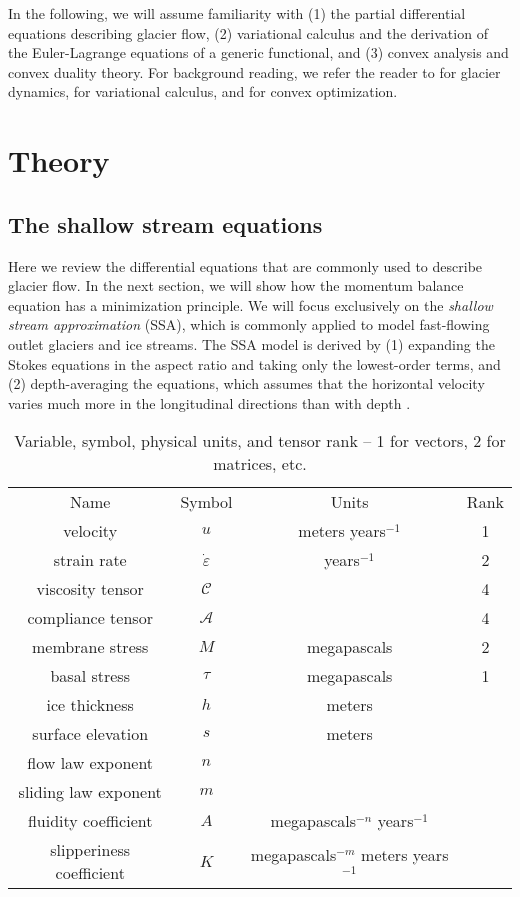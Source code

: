 \documentclass[review,oneside]{igs}
\begin{document}
In the following, we will assume familiarity with (1) the partial differential equations describing glacier flow, (2) variational calculus and the derivation of the Euler-Lagrange equations of a generic functional, and (3) convex analysis and convex duality theory.
For background reading, we refer the reader to \citet{greve2009dynamics} for glacier dynamics, \citet{weinstock1974calculus} for variational calculus, and \citet{boyd2004convex} for convex optimization.



\section{Theory}

\subsection{The shallow stream equations}

Here we review the differential equations that are commonly used to describe glacier flow.
In the next section, we will show how the momentum balance equation has a minimization principle.
We will focus exclusively on the \emph{shallow stream approximation} (SSA), which is commonly applied to model fast-flowing outlet glaciers and ice streams.
The SSA model is derived by (1) expanding the Stokes equations in the aspect ratio and taking only the lowest-order terms, and (2) depth-averaging the equations, which assumes that the horizontal velocity varies much more in the longitudinal directions than with depth \citep{greve2009dynamics}.

\begin{table}[h]
    \begin{tabular}{cccc}
        \cline{1-4}
        Name & Symbol & Units & Rank \\
        \cline{1-4}
        velocity & $u$ & meters years${}^{-1}$ & 1 \\
        strain rate & $\dot\varepsilon$ & years${}^{-1}$ & 2 \\
        viscosity tensor & $\mathscr{C}$ & & 4 \\
        compliance tensor & $\mathscr{A}$ & & 4 \\
        membrane stress & $M$ & megapascals & 2 \\
        basal stress & $\tau$ & megapascals & 1 \\
        ice thickness & $h$ & meters &  \\
        surface elevation & $s$ & meters &  \\
        flow law exponent & $n$ & &  \\
        sliding law exponent & $m$ & &  \\
        fluidity coefficient & $A$ & megapascals${}^{-n}$ years${}^{-1}$ &  \\
        slipperiness coefficient & $K$ & megapascals${}^{-m}$ meters years${}^{-1}$ &
    \end{tabular}
    \caption{Variable, symbol, physical units, and tensor rank -- 1 for vectors, 2 for matrices, etc.}
    \label{tab:symbols}
\end{table}
\end{document}
